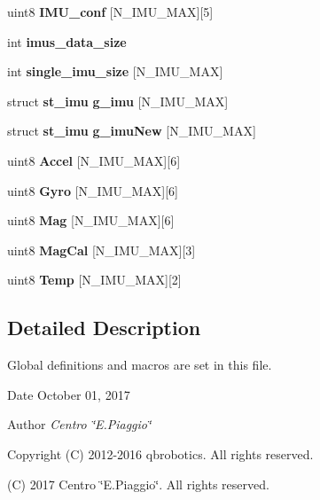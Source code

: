 \begin{DoxyCompactItemize}
\mbox{\label{globals_8h_a9e908aa8750ba310d61de278c5d8525c}} 
uint8 {\bfseries I\+M\+U\+\_\+conf} [N\+\_\+\+I\+M\+U\+\_\+\+M\+AX][5]
\item 
\mbox{\label{globals_8h_a86272fcfcab512d38a11824196df4bbc}} 
int {\bfseries imus\+\_\+data\+\_\+size}
\item 
\mbox{\label{globals_8h_aca96c483c3e269e3805aa861ced0aef5}} 
int {\bfseries single\+\_\+imu\+\_\+size} [N\+\_\+\+I\+M\+U\+\_\+\+M\+AX]
\item 
\mbox{\label{globals_8h_a86bb710944c248adeda63ded90db872a}} 
struct \textbf{ st\+\_\+imu} {\bfseries g\+\_\+imu} [N\+\_\+\+I\+M\+U\+\_\+\+M\+AX]
\item 
\mbox{\label{globals_8h_a9fa446daf1b4e3d6cc394fdc88e0ff63}} 
struct \textbf{ st\+\_\+imu} {\bfseries g\+\_\+imu\+New} [N\+\_\+\+I\+M\+U\+\_\+\+M\+AX]
\item 
\mbox{\label{globals_8h_a187c605f3898cf11e09f6f469c265920}} 
uint8 {\bfseries Accel} [N\+\_\+\+I\+M\+U\+\_\+\+M\+AX][6]
\item 
\mbox{\label{globals_8h_a49dba88a31d1b3b4190065b9ef1649fe}} 
uint8 {\bfseries Gyro} [N\+\_\+\+I\+M\+U\+\_\+\+M\+AX][6]
\item 
\mbox{\label{globals_8h_a5d88408ccb73729f049a52b4d1daaadf}} 
uint8 {\bfseries Mag} [N\+\_\+\+I\+M\+U\+\_\+\+M\+AX][6]
\item 
\mbox{\label{globals_8h_a1e598e1bdae5fe927fbd1f396161f3a6}} 
uint8 {\bfseries Mag\+Cal} [N\+\_\+\+I\+M\+U\+\_\+\+M\+AX][3]
\item 
\mbox{\label{globals_8h_af5f2d49e123a057d358297a34194ebdc}} 
uint8 {\bfseries Temp} [N\+\_\+\+I\+M\+U\+\_\+\+M\+AX][2]
\end{DoxyCompactItemize}


\subsection{Detailed Description}
Global definitions and macros are set in this file. 

\begin{DoxyDate}{Date}
October 01, 2017 
\end{DoxyDate}
\begin{DoxyAuthor}{Author}
{\itshape Centro \char`\"{}\+E.\+Piaggio\char`\"{}} 
\end{DoxyAuthor}
\begin{DoxyCopyright}{Copyright}
(C) 2012-\/2016 qbrobotics. All rights reserved. 

(C) 2017 Centro \char`\"{}\+E.\+Piaggio\char`\"{}. All rights reserved. 
\end{DoxyCopyright}
